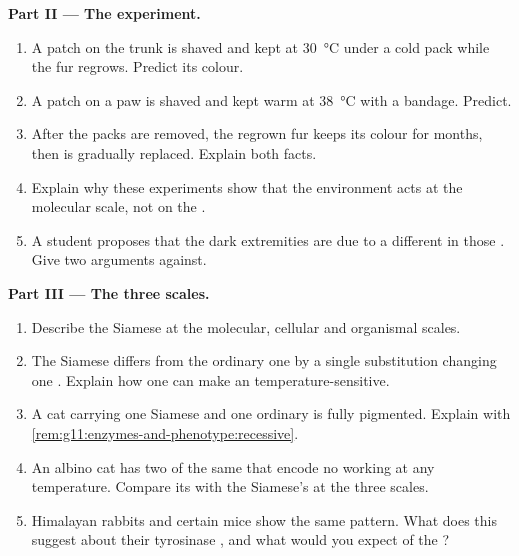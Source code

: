 \begin{problem}
\medskip
\noindent\textbf{Part II --- The experiment.}
\begin{enumerate}[resume]
  \item A patch on the trunk is shaved and kept at \qty{30}{\celsius}
        under a cold pack while the fur regrows. Predict its colour.
  \item A patch on a paw is shaved and kept warm at \qty{38}{\celsius}
        with a bandage. Predict.
  \item After the packs are removed, the regrown fur keeps its colour
        for months, then is gradually replaced. Explain both facts.
  \item Explain why these experiments show that the environment acts
        at the molecular scale, not on the .
  \item A student proposes that the dark extremities are due to a
        different  in those . Give two arguments against.
\end{enumerate}

\medskip
\noindent\textbf{Part III --- The three scales.}
\begin{enumerate}[resume]
  \item Describe the Siamese  at the molecular, cellular and
        organismal scales.
  \item The Siamese  differs from the ordinary one by a single
        substitution changing one . Explain how one  can make an  temperature-sensitive.
  \item A cat carrying one Siamese and one ordinary  is fully
        pigmented. Explain with
        \cref{rem:g11:enzymes-and-phenotype:recessive}.
  \item An albino cat has two  of the same  that encode no
        working  at any temperature. Compare its  with
        the Siamese's at the three scales.
  \item Himalayan rabbits and certain mice show the same pattern.
        What does this suggest about their tyrosinase , and what
        would you expect of the ?
\end{enumerate}


\end{problem}
